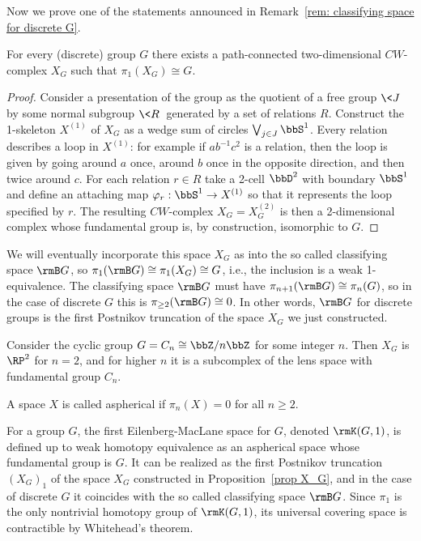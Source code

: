 Now we prove one of the statements announced in Remark~\ref{rem: classifying space for discrete G}. 
\begin{prop}\label{prop X_G}
    For every (discrete) group $G$ there exists a path-connected two-dimensional $CW$-complex $X_G$ such that $\pi_1(X_G)\cong G$.
\end{prop}
\begin{proof}
    Consider a presentation of the group as the quotient of a free group $\<J\>$ by some normal subgroup $\<R\>$ generated by a set of relations $R$. Construct the 1-skeleton $X^{(1)}$ of $X_G$ as a wedge sum of circles $\bigvee_{j\in J}\bbS^1$. Every relation describes a loop in $X^{(1)}$: for example if $ab^{-1}c^2$ is a relation, then the loop is given by going around $a$ once, around $b$ once in the opposite direction, and then twice around $c$. For each relation $r\in R$ take a 2-cell $\bbD^2$ with boundary $\bbS^{1}$ and define an attaching map $\varphi_r:\bbS^1\to X^{(1)}$ so that it represents the loop specified by $r$. The resulting $CW$-complex $X_G=X^{(2)}_G$ is then a 2-dimensional complex whose fundamental group is, by construction, isomorphic to $G$.
\end{proof}
We will eventually incorporate this space $X_G$ as into the so called classifying space $\rmB G$, so $\pi_1(\rmB G)\cong \pi_1(X_G)\cong G$, i.e., the inclusion is a weak 1-equivalence. The classifying space $\rmB G$ must have $\pi_{n+1}(\rmB G)\cong \pi_{n}(G)$, so in the case of discrete $G$ this is $\pi_{\geq 2}(\rmB G)\cong 0$. In other words, $\rmB G$ for discrete groups is the first Postnikov truncation of the space $X_G$ we just constructed.


\begin{example}
    Consider the cyclic group $G=C_n\cong \bbZ\slash n\bbZ$ for some integer $n$. Then $X_G$ is $\RP^2$ for $n=2$, and for higher $n$ it is a subcomplex of the lens space with fundamental group $C_n$.
\end{example}

\begin{defn}
    A space $X$ is called aspherical if $\pi_n(X)=0$ for all $n\geq 2$.
\end{defn}

\begin{defn}\label{def: K(G,1)}
    For a group $G$, the first Eilenberg-MacLane space for $G$, denoted $\rmK(G,1)$, is defined up to weak homotopy equivalence as an aspherical space whose fundamental group is $G$. It can be realized as the first Postnikov truncation $(X_G)_1$ of the space $X_G$ constructed in Proposition~\ref{prop X_G}, and in the case of discrete $G$ it coincides with the so called classifying space $\rmB G$. Since $\pi_1$ is the only nontrivial homotopy group of $\rmK(G,1)$, its universal covering space is contractible by Whitehead's theorem.
\end{defn}


